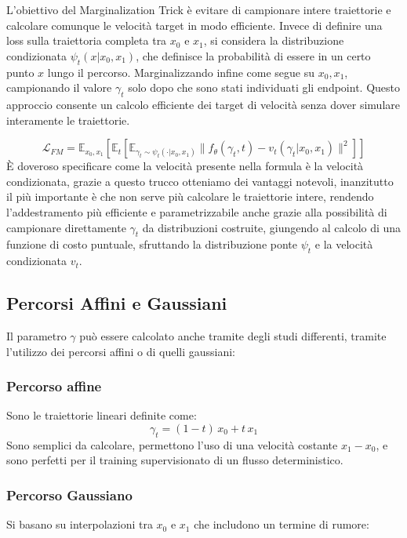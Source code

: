 L’obiettivo del Marginalization Trick è evitare di campionare intere traiettorie e calcolare comunque le velocità target in modo efficiente. Invece di definire una loss sulla traiettoria completa tra $x_0$ e $x_1$, si considera la distribuzione condizionata $\psi_t(x | x_0, x_1)$, che definisce la probabilità di essere in un certo punto $x$ lungo il percorso. Marginalizzando infine come segue su $x_0, x_1$, campionando il valore $\gamma_t$ solo dopo che sono stati individuati gli endpoint. Questo approccio consente un calcolo efficiente dei target di velocità senza dover simulare interamente le traiettorie.

\begin{equation}
    \mathcal{L}_{FM} =\mathbb{E}_{x_0,x_1}\left[\mathbb{E}_t\left[\mathbb{E}_{\gamma_t\sim\psi_t(\cdot|x_0,x_1)}\|f_\theta(\gamma_t,t) - v_t(\gamma_t|x_0,x_1)\|^2\right]\right]
\end{equation}
È doveroso specificare come la velocità presente nella formula è la velocità condizionata, grazie a questo trucco otteniamo dei vantaggi notevoli, inanzitutto il più importante è che non serve più calcolare le traiettorie intere, rendendo l'addestramento più efficiente e parametrizzabile anche grazie alla possibilità di campionare direttamente $\gamma_t$ da distribuzioni costruite, giungendo al calcolo di una funzione di costo puntuale, sfruttando la distribuzione ponte $\psi_t$ e la velocità condizionata $v_t$.

\subsection{Percorsi Affini e Gaussiani}
Il parametro $\gamma$ può essere calcolato anche tramite degli studi differenti, tramite l'utilizzo dei percorsi affini o di quelli gaussiani:

\subsubsection{Percorso affine}
Sono le traiettorie lineari definite come:
\begin{equation}
    \gamma_t = (1-t)\,x_0 + t\,x_1
\end{equation}
Sono semplici da calcolare, permettono l’uso di una velocità costante $x_1-x_0$, e sono perfetti per il training supervisionato di un flusso deterministico.

\subsubsection{Percorso Gaussiano}
Si basano su interpolazioni tra $x_0$ e $x_1$ che includono un termine di rumore:

